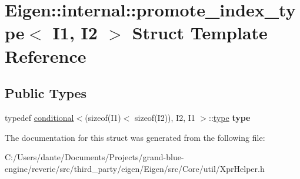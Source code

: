 \hypertarget{struct_eigen_1_1internal_1_1promote__index__type}{}\section{Eigen\+::internal\+::promote\+\_\+index\+\_\+type$<$ I1, I2 $>$ Struct Template Reference}
\label{struct_eigen_1_1internal_1_1promote__index__type}
\subsection*{Public Types}
\begin{DoxyCompactItemize}
\item 
\mbox{\label{struct_eigen_1_1internal_1_1promote__index__type_a191fd87e6a78044bf2c6214682be09e2}} 
typedef \mbox{\hyperlink{struct_eigen_1_1internal_1_1conditional}{conditional}}$<$(sizeof(I1)$<$ sizeof(I2)), I2, I1 $>$\+::\mbox{\hyperlink{struct_eigen_1_1internal_1_1conditional}{type}} {\bfseries type}
\end{DoxyCompactItemize}


The documentation for this struct was generated from the following file\+:\begin{DoxyCompactItemize}
\item 
C\+:/\+Users/dante/\+Documents/\+Projects/grand-\/blue-\/engine/reverie/src/third\+\_\+party/eigen/\+Eigen/src/\+Core/util/Xpr\+Helper.\+h\end{DoxyCompactItemize}
